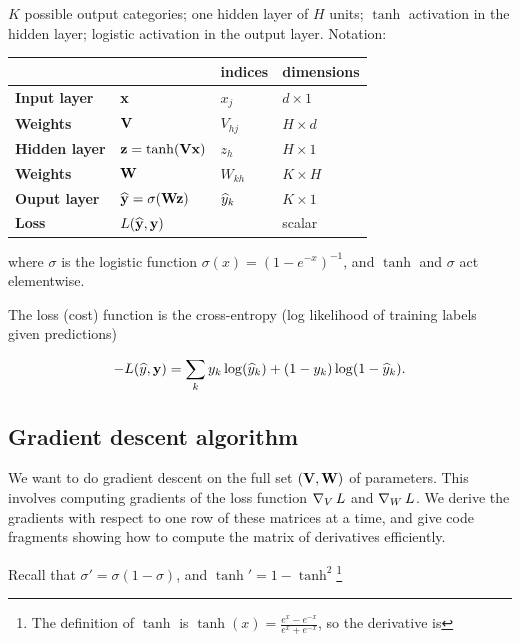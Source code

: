 \begin{mdframed}
$K$ possible output categories; one hidden layer of $H$ units; $\tanh$
activation in the hidden layer; logistic activation in the output
layer. Notation:

\begin{tabular}{l|l|l|l}
                        &                                  & indices   & dimensions \\
  \hline
  \textbf{Input layer}  & $\mathbf x$                             & $x_j$     & $d \times 1$ \\
  \textbf{Weights}      & $\mathbf V$                             & $V_{hj}$  & $H \times d$ \\
  \textbf{Hidden layer} & $\mathbf z = \tanh(\mathbf V \mathbf x)$          & $z_h$     & $H \times 1$ \\
  \textbf{Weights}      & $\mathbf W$                             & $W_{kh}$  & $K \times H$ \\
  \textbf{Ouput layer}  & $\mathbf {\widehat{y}} = \sigma(\mathbf W \mathbf z)$     & $\widehat{y}_k$ & $K \times 1$ \\
  \textbf{Loss}         & $L(\mathbf {\widehat{y}}, \mathbf y)$          &           & scalar \\
\end{tabular}

where $\sigma$ is the logistic function $\sigma(x) = (1-e^{-x})^{-1}$, and
$\tanh$ and $\sigma$ act elementwise.

The loss (cost) function is the cross-entropy (log likelihood of training labels given
predictions)

\begin{align*}
  -L(\widehat{y}, \mathbf y) = \sum_k y_k \log(\widehat{y}_k) + (1 - y_k) \log( 1 - \widehat{y}_k).
\end{align*}

\subsection{Gradient descent algorithm}

We want to do gradient descent on the full set $(\mathbf V, \mathbf W)$ of
parameters. This involves computing gradients of the loss function $\operatorname{\nabla}_V L$
and $\operatorname{\nabla}_W L$. We derive the gradients with respect to one row of these
matrices at a time, and give code fragments showing how to compute the matrix
of derivatives efficiently.

Recall that $\sigma' = \sigma (1 - \sigma)$, and $\tanh' = 1 - \tanh^2$\footnote{
The definition of $\tanh$ is $\tanh(x) = \frac{e^x - e^{-x}}{e^x + e^{-x}}$, so
the derivative is

}
\end{mdframed}

